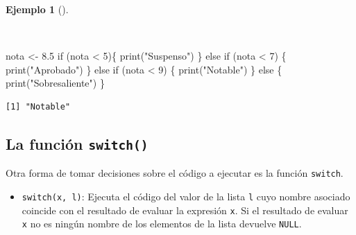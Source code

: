 \documentclass[
  a4paper,
]{scrreport}
\newenvironment{Shaded}{\begin{snugshade}}{\end{snugshade}}
\newcommand{\ControlFlowTok}[1]{\textcolor[rgb]{0.00,0.23,0.31}{#1}}
\newcommand{\DecValTok}[1]{\textcolor[rgb]{0.68,0.00,0.00}{#1}}
\newcommand{\FloatTok}[1]{\textcolor[rgb]{0.68,0.00,0.00}{#1}}
\newcommand{\FunctionTok}[1]{\textcolor[rgb]{0.28,0.35,0.67}{#1}}
\newcommand{\NormalTok}[1]{\textcolor[rgb]{0.00,0.23,0.31}{#1}}
\newcommand{\OtherTok}[1]{\textcolor[rgb]{0.00,0.23,0.31}{#1}}
\newcommand{\SpecialCharTok}[1]{\textcolor[rgb]{0.37,0.37,0.37}{#1}}
\newcommand{\StringTok}[1]{\textcolor[rgb]{0.13,0.47,0.30}{#1}}
\providecommand{\tightlist}{%
  \setlength{\itemsep}{0pt}\setlength{\parskip}{0pt}}\usepackage{longtable,booktabs,array}
\theoremstyle{definition}
\theoremstyle{definition}
\newtheorem{example}{Ejemplo}[chapter]
\theoremstyle{remark}
\begin{document}
\begin{example}[]\protect\hypertarget{exm-condicional-multiple}{}\label{exm-condicional-multiple}

~

\begin{Shaded}
\begin{Highlighting}[]
\NormalTok{nota }\OtherTok{\textless{}{-}} \FloatTok{8.5}
\ControlFlowTok{if}\NormalTok{ (nota }\SpecialCharTok{\textless{}} \DecValTok{5}\NormalTok{)\{}
  \FunctionTok{print}\NormalTok{(}\StringTok{"Suspenso"}\NormalTok{)}
\NormalTok{\} }\ControlFlowTok{else} \ControlFlowTok{if}\NormalTok{ (nota }\SpecialCharTok{\textless{}} \DecValTok{7}\NormalTok{) \{}
  \FunctionTok{print}\NormalTok{(}\StringTok{"Aprobado"}\NormalTok{)}
\NormalTok{\} }\ControlFlowTok{else} \ControlFlowTok{if}\NormalTok{ (nota }\SpecialCharTok{\textless{}} \DecValTok{9}\NormalTok{) \{}
  \FunctionTok{print}\NormalTok{(}\StringTok{"Notable"}\NormalTok{)}
\NormalTok{\} }\ControlFlowTok{else}\NormalTok{ \{}
  \FunctionTok{print}\NormalTok{(}\StringTok{"Sobresaliente"}\NormalTok{)}
\NormalTok{\}}
\end{Highlighting}
\end{Shaded}

\begin{verbatim}
[1] "Notable"
\end{verbatim}

\end{example}

\hypertarget{la-funciuxf3n-switch}{%
\subsection{\texorpdfstring{La función
\texttt{switch()}}{La función switch()}}\label{la-funciuxf3n-switch}}

Otra forma de tomar decisiones sobre el código a ejecutar es la función
\texttt{switch}.

\begin{itemize}
\tightlist
\item
  \texttt{switch(x,\ l)}: Ejecuta el código del valor de la lista
  \texttt{l} cuyo nombre asociado coincide con el resultado de evaluar
  la expresión \texttt{x}. Si el resultado de evaluar \texttt{x} no es
  ningún nombre de los elementos de la lista devuelve \texttt{NULL}.
\end{itemize}
\end{document}
